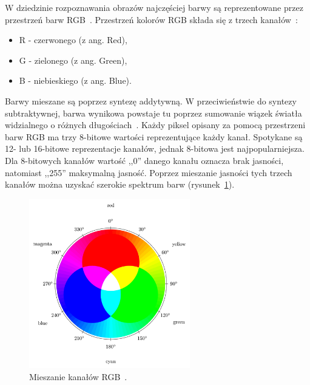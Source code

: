 \documentclass[a4paper,twoside,12pt]{book}
\begin{document}
    W dziedzinie rozpoznawania obrazów najczęściej barwy są reprezentowane przez przestrzeń barw
    RGB~\cite{przestrzenieKolorow}.
    Przestrzeń kolorów RGB składa się z trzech kanałów~\cite{kolory}:
    \begin{itemize}
        \item R - czerwonego (z ang. Red),
        \item G - zielonego (z ang. Green),
        \item B - niebieskiego (z ang. Blue).
    \end{itemize}
%

    Barwy mieszane są poprzez syntezę addytywną.
    W przeciwieństwie do syntezy subtraktywnej, barwa wynikowa powstaje tu poprzez sumowanie wiązek światła widzialnego o
    różnych długościach~\cite{przestrzenieKolorow}.
    Każdy piksel opisany za pomocą przestrzeni barw RGB ma trzy 8-bitowe wartości reprezentujące każdy kanał.
    Spotykane
    są 12- lub 16-bitowe reprezentacje kanałów, jednak 8-bitowa jest najpopularniejsza.
    Dla 8-bitowych kanałów
    wartość ,,0''
    danego kanału oznacza brak jasności, natomiast ,,255'' maksymalną jasność.
    Poprzez mieszanie jasności tych trzech kanałów
    można uzyskać szerokie spektrum barw (rysunek~\ref{fig.mieszanieKolorow}).

    \begin{figure}[h!]
        \centering
        \includegraphics[width=7cm]{Obrazy/mieszanieKolorow.jpg}
        \caption{Mieszanie kanałów RGB~\cite{colorMixing}.}
        \label{fig.mieszanieKolorow}
    \end{figure}
\end{document}
